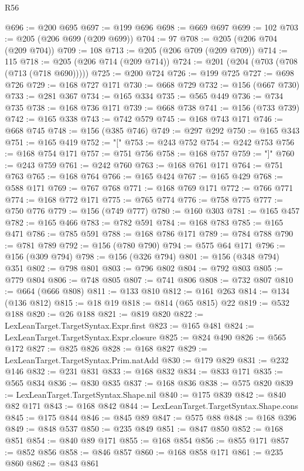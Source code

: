 \begin{lexlean}{R56}
\begin{coremodule}
@696 := @200 @695
@697 := @199 @696
@698 := @669 @697
@699 := 102
@703 := @205 (@206 @699 (@209 @699))
@704 := 97
@708 := @205 (@206 @704 (@209 @704))
@709 := 108
@713 := @205 (@206 @709 (@209 @709))
@714 := 115
@718 := @205 (@206 @714 (@209 @714))
@724 := @201 (@204 (@703 (@708 (@713 (@718 @690)))))
@725 := @200 @724
@726 := @199 @725
@727 := @698 @726
@729 := @168 @727 @171
@730 := @668 @729
@732 := @156 (@667 @730)
@733 := @281 @367
@734 := @165 @334
@735 := @565 @449
@736 := @734 @735
@738 := @168 @736 @171
@739 := @668 @738
@741 := @156 (@733 @739)
@742 := @165 @338
@743 := @742 @579
@745 := @168 @743 @171
@746 := @668 @745
@748 := @156 (@385 @746)
@749 := @297 @292
@750 := @165 @343
@751 := @165 @419
@752 := "["
@753 := @243 @752
@754 := @242 @753
@756 := @168 @754 @171
@757 := @751 @756
@758 := @168 @757
@759 := "]"
@760 := @243 @759
@761 := @242 @760
@763 := @168 @761 @171
@764 := @751 @763
@765 := @168 @764
@766 := @165 @424
@767 := @165 @429
@768 := @588 @171
@769 := @767 @768
@771 := @168 @769 @171
@772 := @766 @771
@774 := @168 @772 @171
@775 := @765 @774
@776 := @758 @775
@777 := @750 @776
@779 := @156 (@749 @777)
@780 := @160 @303
@781 := @165 @457
@782 := @165 @466
@783 := @782 @591
@784 := @168 @783
@785 := @165 @471
@786 := @785 @591
@788 := @168 @786 @171
@789 := @784 @788
@790 := @781 @789
@792 := @156 (@780 @790)
@794 := @575 @64 @171
@796 := @156 (@309 @794)
@798 := @156 (@326 @794)
@801 := @156 (@348 @794) @351
@802 := @798 @801
@803 := @796 @802
@804 := @792 @803
@805 := @779 @804
@806 := @748 @805
@807 := @741 @806
@808 := @732 @807
@810 := @664 (@666 @808)
@811 := @133 @810
@812 := @161 @263
@814 := @134 (@136 @812)
@815 := @18 @19
@818 := @814 (@65 @815) @22
@819 := @532 @188
@820 := @26 @188
@821 := @819 @820
@822 := LexLeanTarget.TargetSyntax.Expr.first
@823 := @165 @481
@824 := LexLeanTarget.TargetSyntax.Expr.closure
@825 := @824 @490
@826 := @565 @172
@827 := @825 @826
@828 := @168 @827
@829 := LexLeanTarget.TargetSyntax.Prim.natAdd
@830 := @179 @829
@831 := @232 @146
@832 := @231 @831
@833 := @168 @832
@834 := @833 @171
@835 := @565 @834
@836 := @830 @835
@837 := @168 @836
@838 := @575 @820
@839 := LexLeanTarget.TargetSyntax.Shape.nil
@840 := @175 @839
@842 := @840 @82 @171
@843 := @168 @842
@844 := LexLeanTarget.TargetSyntax.Shape.cons
@845 := @175 @844
@846 := @845 @89
@847 := @575 @88
@848 := @168 @396
@849 := @848 @537
@850 := @235 @849
@851 := @847 @850
@852 := @168 @851
@854 := @840 @89 @171
@855 := @168 @854
@856 := @855 @171
@857 := @852 @856
@858 := @846 @857
@860 := @168 @858 @171
@861 := @235 @860
@862 := @843 @861

\end{coremodule}
\end{lexlean}
